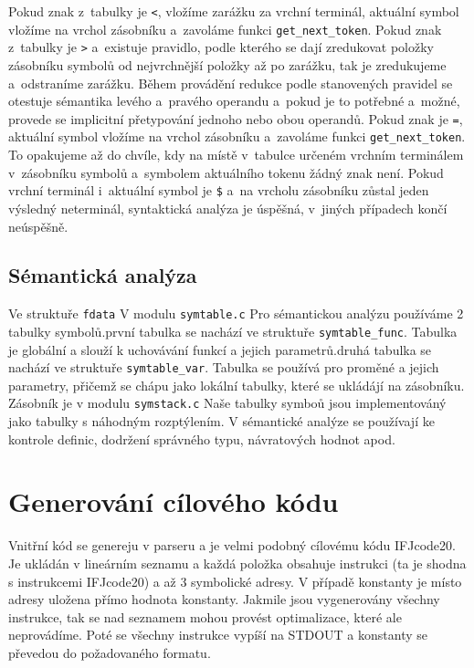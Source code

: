 \documentclass[a4paper, 11pt]{article}
\begin{document}
	Pokud znak z~tabulky je \texttt{<}, vložíme zarážku za vrchní terminál, aktuální symbol vložíme na vrchol zásobníku
	a~zavoláme funkci \texttt{get\_next\_token}. Pokud znak z~tabulky je \texttt{>} a~existuje pravidlo, podle kterého
	se dají zredukovat položky zásobníku symbolů od nejvrchnější položky až po zarážku, tak je zredukujeme a~odstraníme
	zarážku. Během provádění redukce podle stanovených pravidel se otestuje sémantika levého a~pravého operandu a~pokud
	je to potřebné a~možné, provede se implicitní přetypování jednoho nebo obou operandů. Pokud znak je \texttt{=}, aktuální
	symbol vložíme na vrchol zásobníku a~zavoláme funkci \texttt{get\_next\_token}. To opakujeme až do chvíle, kdy na místě
	v~tabulce určeném vrchním terminálem v~zásobníku symbolů a~symbolem aktuálního tokenu žádný znak není. Pokud vrchní
	terminál i~aktuální symbol je \texttt{\$} a~na vrcholu zásobníku zůstal jeden výsledný neterminál, syntaktická analýza je
	úspěšná, v~jiných případech končí neúspěšně.



	
	\subsection{Sémantická analýza}

    Ve struktuře \texttt{fdata} 
	V modulu \texttt{symtable.c} Pro sémantickou analýzu používáme 2 tabulky symbolů.první tabulka se nachází ve struktuře \texttt{symtable\_func}. Tabulka je globální a slouží k uchovávání funkcí a jejich parametrů.druhá tabulka se nachází ve struktuře \texttt{symtable\_var}. Tabulka se používá pro proměné a jejich parametry, přičemž se chápu jako lokální tabulky, které se ukládájí na zásobníku. Zásobník je v modulu \texttt{symstack.c} Naše tabulky symboů jsou implementováný jako tabulky s náhodným rozptýlením. V sémantické analýze se používají ke kontrole definic, dodržení správného typu, návratových hodnot apod.

	\section{Generování cílového kódu}

	Vnitřní kód se genereju v parseru a je velmi podobný cílovému kódu IFJcode20. 
	Je ukládán v lineárním seznamu a každá položka obsahuje instrukci (ta je shodna s instrukcemi IFJcode20) a až 3 symbolické adresy.
	V případě konstanty je místo adresy uložena přímo hodnota konstanty. Jakmile jsou vygenerovány všechny instrukce, 
	tak se nad seznamem mohou provést optimalizace, které ale neprovádíme. Poté se všechny instrukce vypíší na STDOUT a konstanty se převedou do
	požadovaného formatu.
\end{document}
